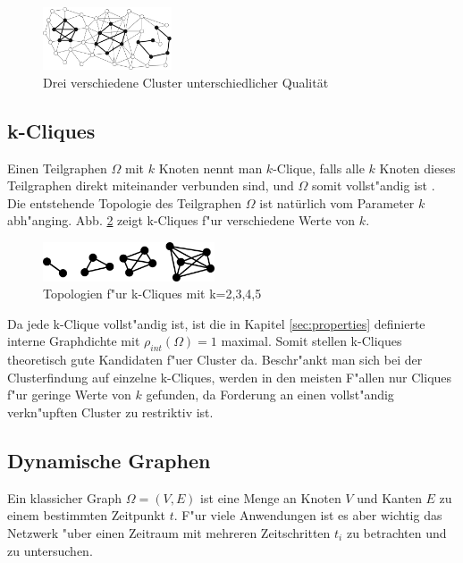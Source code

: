 \documentclass[journal]{vgtc}
\begin{document}
  \begin{figure}[h]
    \centering
    \includegraphics[width=1.5in]{images/good_cluster}
    \caption{\label{fig:comp_cluster} Drei verschiedene Cluster unterschiedlicher Qualität \cite{Schaeffer}}
  \end{figure}
  
  \subsection{k-Cliques}
  \label{sec:k_cliques}
  	Einen Teilgraphen $\Omega$ mit $k$ Knoten nennt man $k$-Clique, falls alle $k$ Knoten dieses 
  	Teilgraphen direkt miteinander verbunden sind, und $\Omega$ somit vollst"andig ist \cite{CPM}. 
  	Die entstehende Topologie des Teilgraphen $\Omega$ ist natürlich vom Parameter $k$ abh"anging.
  	Abb. \ref{fig:k_cliques} zeigt k-Cliques f"ur verschiedene Werte von $k$.
  	
  	\begin{figure}[h]
  	 \centering
  	 \includegraphics[width=2in]{images/k-cliques-example}
  	 \caption{\label{fig:k_cliques} Topologien f"ur k-Cliques mit k=2,3,4,5}
  	\end{figure}

  	
  	Da jede k-Clique vollst"andig ist, ist die in Kapitel \ref{sec:properties} definierte
  	interne Graphdichte mit $\rho_{int}(\Omega)=1$ maximal. Somit stellen k-Cliques theoretisch gute 
  	Kandidaten f"uer Cluster da. Beschr"ankt man sich bei der Clusterfindung auf einzelne k-Cliques,
  	werden in den meisten F"allen nur Cliques f"ur geringe Werte von $k$ gefunden, da Forderung an einen vollst"andig
  	verkn"upften Cluster zu restriktiv ist.
    
  \subsection{Dynamische Graphen}
	Ein klassicher Graph $\Omega=(V,E)$ ist eine Menge an Knoten $V$ und
	Kanten $E$ zu einem bestimmten Zeitpunkt $t$. F"ur viele Anwendungen
	ist es aber wichtig das Netzwerk "uber einen Zeitraum mit mehreren Zeitschritten $t_i$ zu
	betrachten und zu untersuchen.
	
\end{document}
